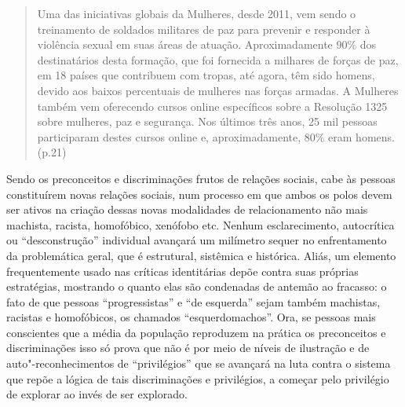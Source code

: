 \begin{quote}
Uma das iniciativas globais da  Mulheres, desde 2011, vem sendo o
treinamento de soldados militares de paz para prevenir e responder à
violência sexual em suas áreas de atuação. Aproximadamente 90\% dos
destinatários desta formação, que foi fornecida a milhares de forças de
paz, em 18 países que contribuem com tropas, até agora, têm sido homens,
devido aos baixos percentuais de mulheres nas forças armadas. A 
Mulheres também vem oferecendo cursos online específicos sobre a
Resolução 1325 sobre mulheres, paz e segurança. Nos últimos três anos,
25 mil pessoas participaram destes cursos online e, aproximadamente,
80\% eram homens. (p.21)
\end{quote}

Sendo os preconceitos e discriminações frutos de relações sociais, cabe
às pessoas constituírem novas relações sociais, num processo em que
ambos os polos devem ser ativos na criação dessas novas modalidades de
relacionamento não mais machista, racista, homofóbico, xenófobo etc.
Nenhum esclarecimento, autocrítica ou ``desconstrução'' individual
avançará um milímetro sequer no enfrentamento da problemática geral, que
é estrutural, sistêmica e histórica. Aliás, um elemento frequentemente
usado nas críticas identitárias depõe contra suas próprias estratégias,
mostrando o quanto elas são condenadas de antemão ao fracasso: o fato de
que pessoas ``progressistas'' e ``de esquerda'' sejam também machistas,
racistas e homofóbicos, os chamados ``esquerdomachos''. Ora, se pessoas
mais conscientes que a média da população reproduzem na prática os
preconceitos e discriminações isso só prova que não é por meio de níveis
de ilustração e de auto"-reconhecimentos de ``privilégios'' que se
avançará na luta contra o sistema que repõe a lógica de tais
discriminações e privilégios, a começar pelo privilégio de explorar ao
invés de ser explorado.

